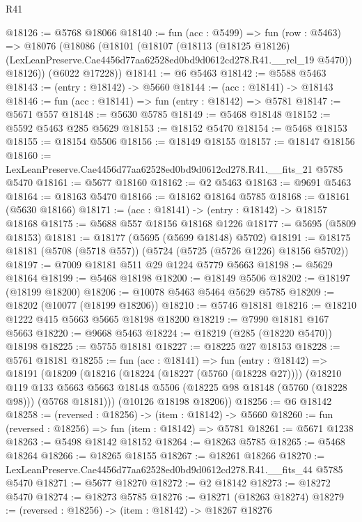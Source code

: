 \begin{lexlean}{R41}
\begin{coremodule}
@18126 := @5768 @18066
@18140 := fun (acc : @5499) =>
  fun (row : @5463) =>
  @18076
    (@18086
      (@18101
        (@18107
          (@18113
            (@18125 @18126)
            (LexLeanPreserve.Cae4456d77aa62528ed0bd9d0612cd278.R41.__rel_19 @5470))
          @18126))
      (@6022 @17228))
@18141 := @6 @5463
@18142 := @5588 @5463
@18143 := (entry : @18142) -> @5660
@18144 := (acc : @18141) -> @18143
@18146 := fun (acc : @18141) => fun (entry : @18142) => @5781
@18147 := @5671 @557
@18148 := @5630 @5785
@18149 := @5468 @18148
@18152 := @5592 @5463 @285 @5629
@18153 := @18152 @5470
@18154 := @5468 @18153
@18155 := @18154 @5506
@18156 := @18149 @18155
@18157 := @18147 @18156
@18160 := LexLeanPreserve.Cae4456d77aa62528ed0bd9d0612cd278.R41.__fits_21 @5785 @5470
@18161 := @5677 @18160
@18162 := @2 @5463
@18163 := @9691 @5463
@18164 := @18163 @5470
@18166 := @18162 @18164 @5785
@18168 := @18161 (@5630 @18166)
@18171 := (acc : @18141) -> (entry : @18142) -> @18157 @18168
@18175 := @5688 @557 @18156 @18168 @1226
@18177 := @5695 (@5809 @18153)
@18181 := @18177 (@5695 (@5699 @18148) @5702)
@18191 := @18175 @18181 (@5708 (@5718 @557)) (@5724 (@5725 (@5726 @1226) @18156 @5702))
@18197 := @7009 @18181 @511 @29 @1224 @5779 @5663
@18198 := @5629 @18164
@18199 := @5468 @18198
@18200 := @18149 @5506
@18202 := @18197 (@18199 @18200)
@18206 := @10078 @5463 @5464 @5629 @5785
@18209 := @18202 (@10077 (@18199 @18206))
@18210 := @5746 @18181
@18216 := @18210 @1222 @415 @5663 @5665 @18198 @18200
@18219 := @7990 @18181 @167 @5663
@18220 := @9668 @5463
@18224 := @18219 (@285 (@18220 @5470)) @18198
@18225 := @5755 @18181
@18227 := @18225 @27 @18153
@18228 := @5761 @18181
@18255 := fun (acc : @18141) =>
  fun (entry : @18142) =>
  @18191
    (@18209
      (@18216
        (@18224 (@18227 (@5760 (@18228 @27))))
        (@18210
          @119
          @133
          @5663
          @5663
          @18148
          @5506
          (@18225 @98 @18148 (@5760 (@18228 @98)))
          (@5768 @18181)))
      (@10126 @18198 @18206))
@18256 := @6 @18142
@18258 := (reversed : @18256) -> (item : @18142) -> @5660
@18260 := fun (reversed : @18256) => fun (item : @18142) => @5781
@18261 := @5671 @1238
@18263 := @5498 @18142 @18152
@18264 := @18263 @5785
@18265 := @5468 @18264
@18266 := @18265 @18155
@18267 := @18261 @18266
@18270 := LexLeanPreserve.Cae4456d77aa62528ed0bd9d0612cd278.R41.__fits_44 @5785 @5470
@18271 := @5677 @18270
@18272 := @2 @18142
@18273 := @18272 @5470
@18274 := @18273 @5785
@18276 := @18271 (@18263 @18274)
@18279 := (reversed : @18256) -> (item : @18142) -> @18267 @18276

\end{coremodule}
\end{lexlean}
